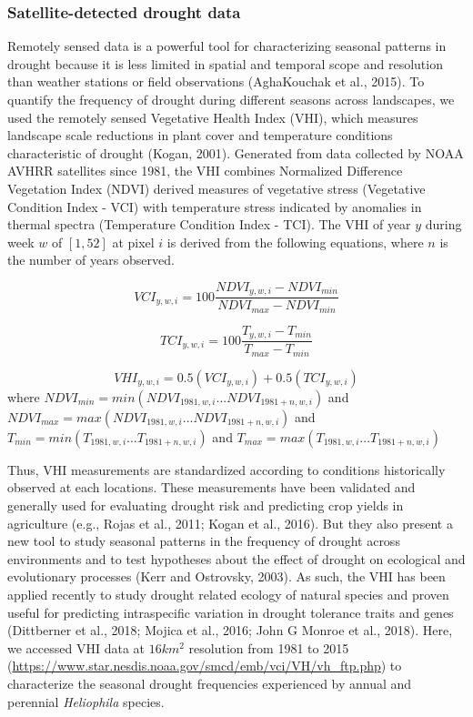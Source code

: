 \documentclass[man,floatsintext]{apa6}
\theoremstyle{definition}
\theoremstyle{definition}
\theoremstyle{definition}
\theoremstyle{remark}
\begin{document}
\hypertarget{satellite-detected-drought-data}{%
\subsubsection{Satellite-detected drought
data}\label{satellite-detected-drought-data}}

Remotely sensed data is a powerful tool for characterizing seasonal
patterns in drought because it is less limited in spatial and temporal
scope and resolution than weather stations or field observations
(AghaKouchak et al., 2015). To quantify the frequency of drought during
different seasons across landscapes, we used the remotely sensed
Vegetative Health Index (VHI), which measures landscape scale reductions
in plant cover and temperature conditions characteristic of drought
(Kogan, 2001). Generated from data collected by NOAA AVHRR satellites
since 1981, the VHI combines Normalized Difference Vegetation Index
(NDVI) derived measures of vegetative stress (Vegetative Condition Index
- VCI) with temperature stress indicated by anomalies in thermal spectra
(Temperature Condition Index - TCI). The VHI of year \(y\) during week
\(w\) of \([1,52]\) at pixel \(i\) is derived from the following
equations, where \(n\) is the number of years observed.

\[VCI_{y,w,i} = 100\frac{NDVI_{y,w,i} - NDVI_{min}}{NDVI_{max} - NDVI_{min}}\]

\[TCI_{y,w,i} = 100\frac{T_{y,w,i} - T_{min}}{T_{max} - T_{min}}\]

\[VHI_{y,w,i} = 0.5(VCI_{y,w,i}) + 0.5(TCI_{y,w,i})\] where
\(NDVI_{min} = min(NDVI_{1981,w,i}...NDVI_{1981+n,w,i})\) and
\(NDVI_{max} = max(NDVI_{1981,w,i}...NDVI_{1981+n,w,i})\) and
\(T_{min} = min(T_{1981,w,i}...T_{1981+n,w,i})\) and
\(T_{max} = max(T_{1981,w,i}...T_{1981+n,w,i})\)

Thus, VHI measurements are standardized according to conditions
historically observed at each locations. These measurements have been
validated and generally used for evaluating drought risk and predicting
crop yields in agriculture (e.g., Rojas et al., 2011; Kogan et al.,
2016). But they also present a new tool to study seasonal patterns in
the frequency of drought across environments and to test hypotheses
about the effect of drought on ecological and evolutionary processes
(Kerr and Ostrovsky, 2003). As such, the VHI has been applied recently
to study drought related ecology of natural species and proven useful
for predicting intraspecific variation in drought tolerance traits and
genes (Dittberner et al., 2018; Mojica et al., 2016; John G Monroe et
al., 2018). Here, we accessed VHI data at \(16km^2\) resolution from
1981 to 2015
(\url{https://www.star.nesdis.noaa.gov/smcd/emb/vci/VH/vh_ftp.php}) to
characterize the seasonal drought frequencies experienced by annual and
perennial \emph{Heliophila} species.
\end{document}
